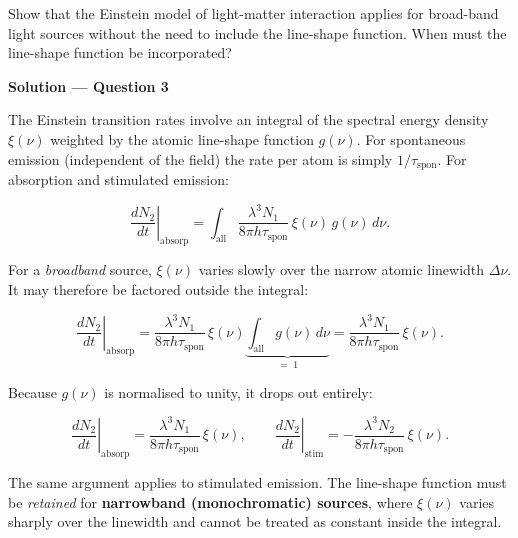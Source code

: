 \begin{question}[Question 3]Show that the Einstein model of light-matter interaction applies for
broad-band light sources without the need to include the line-shape function. When must the
line-shape function be incorporated?
\end{question}

\textbf{\large Solution --- Question 3}

The Einstein transition rates involve an integral of the spectral energy density $\xi(\nu)$ weighted by the atomic line-shape function $g(\nu)$. For spontaneous emission (independent of the field) the rate per atom is simply $1/\tau_\text{spon}$. For absorption and stimulated emission:

\begin{equation*}
  \left.\frac{dN_2}{dt}\right|_\text{absorp}
  = \int_\text{all}\frac{\lambda^{3}N_1}{8\pi h\tau_\text{spon}}\,\xi(\nu)\,g(\nu)\,d\nu.
\end{equation*}

For a \emph{broadband} source, $\xi(\nu)$ varies slowly over the narrow atomic linewidth $\Delta\nu$. It may therefore be factored outside the integral:

\begin{equation*}
  \left.\frac{dN_2}{dt}\right|_\text{absorp}
  = \frac{\lambda^{3}N_1}{8\pi h\tau_\text{spon}}\,\xi(\nu)
    \underbrace{\int_\text{all}g(\nu)\,d\nu}_{=\;1}
  = \frac{\lambda^{3}N_1}{8\pi h\tau_\text{spon}}\,\xi(\nu).
\end{equation*}

Because $g(\nu)$ is normalised to unity, it drops out entirely:

\begin{equation*}
  \boxed{\left.\frac{dN_2}{dt}\right|_\text{absorp} = \frac{\lambda^{3}N_1}{8\pi h\tau_\text{spon}}\,\xi(\nu),
  \qquad
  \left.\frac{dN_2}{dt}\right|_\text{stim} = -\frac{\lambda^{3}N_2}{8\pi h\tau_\text{spon}}\,\xi(\nu).}
\end{equation*}

The same argument applies to stimulated emission. The line-shape function must be \emph{retained} for \textbf{narrowband (monochromatic) sources}, where $\xi(\nu)$ varies sharply over the linewidth and cannot be treated as constant inside the integral.


